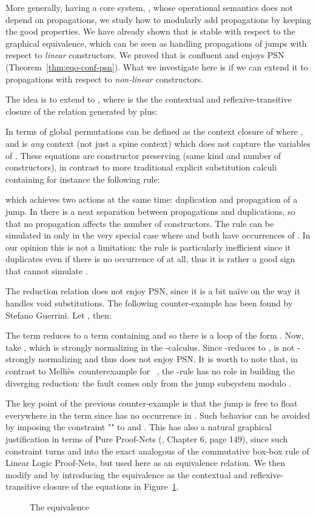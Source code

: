 \documentclass{LMCS}
\renewcommand{\>}{\rightarrow}
\newcommand{\ignore}[1]{}
\newcommand{\mellies}{Melli{\`e}s}
\begin{document}
More generally, having a core system, , whose operational
semantics does not depend on propagations, we study how to modularly add
propagations  by  keeping the good properties. We have
already shown that  is stable with respect to 
the graphical equivalence, which can be seen as handling propagations
of jumps with respect to \textit{linear} constructors. We proved that  is confluent and
enjoys PSN (Theorem~\ref{thm:eqo-conf-psn}). What we investigate here is if we
can extend it to propagations with respect to \textit{non-linear}
constructors.\medskip

The idea is to extend  to , where 
is the the contextual and reflexive-transitive closure
of the relation
generated by  plus:

In terms of global permutations  can be defined as the
  context closure of  where
  , and  is \textit{any}
  context (not just a spine context) which does not capture the
  variables of .  These equations are constructor preserving (same
kind and number of constructors), in contrast to more traditional
explicit substitution calculi containing for instance the following 
rule:

which achieves two actions at the same time: 
duplication and propagation of a jump. In  there is a
neat separation between propagations and duplications, so that no
propagation affects the number of constructors.  The rule 
can be simulated in  only in the very special case where 
and  both have occurrences of . In our opinion this is not a
limitation: the rule  is particularly inefficient since it
duplicates even if there is no occurrence of  at all, thus it is
rather a good sign that  cannot simulate .\medskip

The reduction relation  does not enjoy PSN, since it is a bit na\"ive
on the way it handles void substitutions. The following counter-example has been found by Stefano
Guerrini. Let  , then:

The term  reduces to a term containing  and so there is a loop
of the form .  Now, take ,
which is strongly normalizing in the -calculus.  Since 
-reduces to ,  is not -strongly normalizing
and thus  does not enjoy PSN. It is worth to note that, in
contrast to \mellies\ counterexample for ~\cite{Mellies1995a}, the -rule has
no role in building the diverging reduction: the fault comes only from the
jump subsystem  modulo .\medskip


The key point of the previous counter-example is that the jump 
is free to float everywhere in the term since  has no occurrence in
. Such behavior can be avoided by imposing the constraint "" to  and . This has also a natural graphical
justification in terms of Pure Proof-Nets (\cite{AccattoliTh}, Chapter 6, page 149), since such constraint 
turns  and  into the exact analogous \ignore{form} of the
commutative box-box rule of Linear Logic Proof-Nets, but used here as
an equivalence relation.  We then modify
 and  by
  introducing the equivalence  as the contextual and
  reflexive-transitive closure of the  equations in Figure~\ref{f:boite}.
\begin{figure}[ht]

\caption{The equivalence }
\label{f:boite}
\end{figure}
\end{document}

